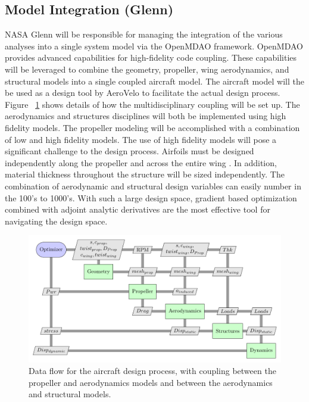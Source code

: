 \documentclass[]{aiaa-tc}
\begin{document}
    \subsection{Model Integration (Glenn)}

    NASA Glenn will be responsible for managing the integration of the various analyses into 
    a single system model via the OpenMDAO framework. OpenMDAO provides advanced 
    capabilities for high-fidelity code coupling. These capabilities will be leveraged to combine the geometry,
    propeller, wing aerodynamics, and structural models into a single coupled aircraft model. The aircraft 
    model will the be used as a design tool by AeroVelo to facilitate the actual design process. 
    Figure ~\ref{fig:n2} shows details of how the multidisciplinary coupling will be set up. The aerodynamics 
    and structures disciplines will both be implemented using high fidelity models. The propeller modeling 
    will be accomplished with a combination of low and high fidelity models. The use of high fidelity models 
    will pose a significant challenge to the design process. Airfoils must be designed independently along the propeller and
    across the entire wing . In addition, material thickness throughout the structure
    will be sized independently. The combination of aerodynamic and structural design variables 
    can easily number in the 100's to 1000's. With such a large design space, gradient based optimization 
    combined with adjoint analytic derivatives are the most effective tool for navigating the design space. 

    \begin{figure} \centering
        \includegraphics[width=.75\textwidth]{xdsm/overall}
        \caption{Data flow for the aircraft design process, with coupling between the propeller and aerodynamics models 
        and between the aerodynamics and structural models. }
        \label{fig:n2}
    \end{figure}
\end{document}
